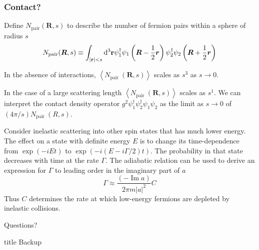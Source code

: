 \begin{frame}
	\frametitle{Contact?}

	Define $N_{\mathrm{pair}}(\boldsymbol{R}, s)$ to describe the number of fermion pairs within a sphere of radius $s$
	$$N_{\mathrm{pair}}(\boldsymbol{R}, s)\equiv \int_{\abs{\vb{r}}<s}\dd^3\vb{r}\psi_{1}^{\dagger} \psi_{1}\left(\boldsymbol{R}-\frac{1}{2} \boldsymbol{r}\right) \psi_{2}^{\dagger} \psi_{2}\left(\boldsymbol{R}+\frac{1}{2} \boldsymbol{r}\right)$$

	In the absence of interactions, $\left\langle N_{\text {pair }}(\boldsymbol{R}, s)\right\rangle$ scales as $s^{3}$ as $s \rightarrow 0$.

	In the case of a large scattering length $\left\langle N_{\text {pair }}(\boldsymbol{R}, s)\right\rangle$ scales as $s^{1}$. We can interpret the contact density operator $g^{2} \psi_{1}^{\dagger} \psi_{2}^{\dagger} \psi_{1} \psi_{2}$ as the limit as $s \rightarrow 0$ of $(4 \pi / s) N_{\text {pair }}(R, s)$.

	Consider inelastic scattering into other spin states that has much lower energy. The effect on a state with definite energy $E$ is to change its time-dependence from $\exp (-i E t)$ to $\exp (-i(E-i \Gamma / 2) t ) $. The probability
	in that state decreases with time at the rate $\Gamma $. The adiabatic relation can be used to derive an expression for $\Gamma$ to leading order in the imaginary part of $a$
	\[
		\Gamma \approx \frac{(-\operatorname{Im} a)}{2 \pi m|a|^{2}} C
	\]
	Thus $C$ determines the rate at which low-energy fermions are depleted by inelastic collisions.

\end{frame}




\appendix
\begin{frame}[standout]
	\Huge Questions?
\end{frame}
\begin{frame}
	\vfill
	\centering
	\begin{beamercolorbox}[sep=8pt,center,shadow=true,rounded=true]{title}
		Backup\par%
	\end{beamercolorbox}
	\vfill
\end{frame}

